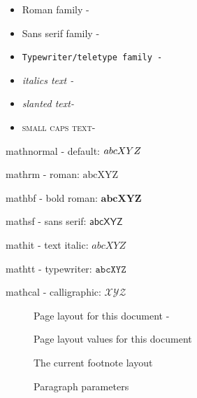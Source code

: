 \begin{itemize}
    \item \textrm{Roman family - \showfont }
    \item \textsf{Sans serif family - \showfont}
    \item \texttt{Typewriter/teletype family - \showfont}
    \item \textit{italics text - \showfont}
    \item \textsl{slanted text- \showfont}
    \item \textsc{small caps text- \showfont}
\end{itemize}




mathnormal -  default: $\mathnormal{abcXYZ}$

mathrm - roman: $\mathrm{abcXYZ}$

mathbf - bold roman: $\mathbf{abcXYZ}$

mathsf - sans serif: $\mathsf{abcXYZ}$

mathit - text italic: $\mathit{abcXYZ}$

mathtt -  typewriter: $\mathtt{abcXYZ}$

mathcal - calligraphic: $\mathcal{XYZ}$



\begin{figure}
    \caption{Page layout for this document -  \showfont} \label{fig:ptrs}
\end{figure}


\begin{figure}
    \caption{Page layout values for this document} \label{fig:ptrsval}

\end{figure}



\begin{figure}
    \caption{The current footnote layout}\label{fig:ftry}
\end{figure}


\begin{figure}
    \caption{Paragraph parameters}\label{fig:fpara}
\end{figure}


